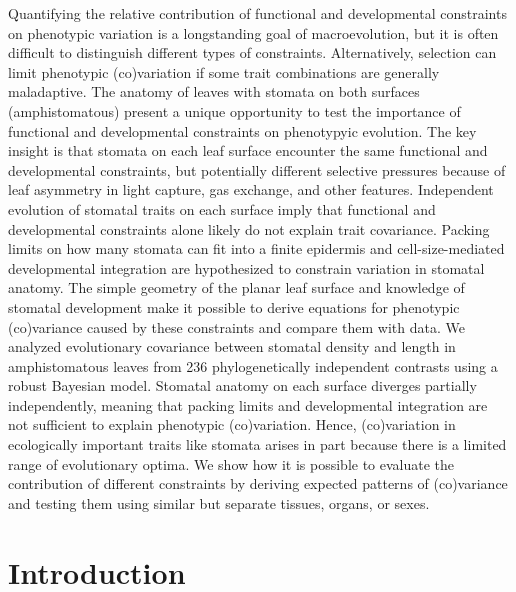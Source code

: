 \documentclass[
  12pt,
]{article}
\begin{document}
Quantifying the relative contribution of functional and developmental constraints on phenotypic variation is a longstanding goal of macroevolution, but it is often difficult to distinguish different types of constraints. Alternatively, selection can limit phenotypic (co)variation if some trait combinations are generally maladaptive. The anatomy of leaves with stomata on both surfaces (amphistomatous) present a unique opportunity to test the importance of functional and developmental constraints on phenotypyic evolution. The key insight is that stomata on each leaf surface encounter the same functional and developmental constraints, but potentially different selective pressures because of leaf asymmetry in light capture, gas exchange, and other features. Independent evolution of stomatal traits on each surface imply that functional and developmental constraints alone likely do not explain trait covariance. Packing limits on how many stomata can fit into a finite epidermis and cell-size-mediated developmental integration are hypothesized to constrain variation in stomatal anatomy. The simple geometry of the planar leaf surface and knowledge of stomatal development make it possible to derive equations for phenotypic (co)variance caused by these constraints and compare them with data. We analyzed evolutionary covariance between stomatal density and length in amphistomatous leaves from 236 phylogenetically independent contrasts using a robust Bayesian model. Stomatal anatomy on each surface diverges partially independently, meaning that packing limits and developmental integration are not sufficient to explain phenotypic (co)variation. Hence, (co)variation in ecologically important traits like stomata arises in part because there is a limited range of evolutionary optima. We show how it is possible to evaluate the contribution of different constraints by deriving expected patterns of (co)variance and testing them using similar but separate tissues, organs, or sexes.\\

\hypertarget{introduction}{%
\section{Introduction}\label{introduction}}
\end{document}
